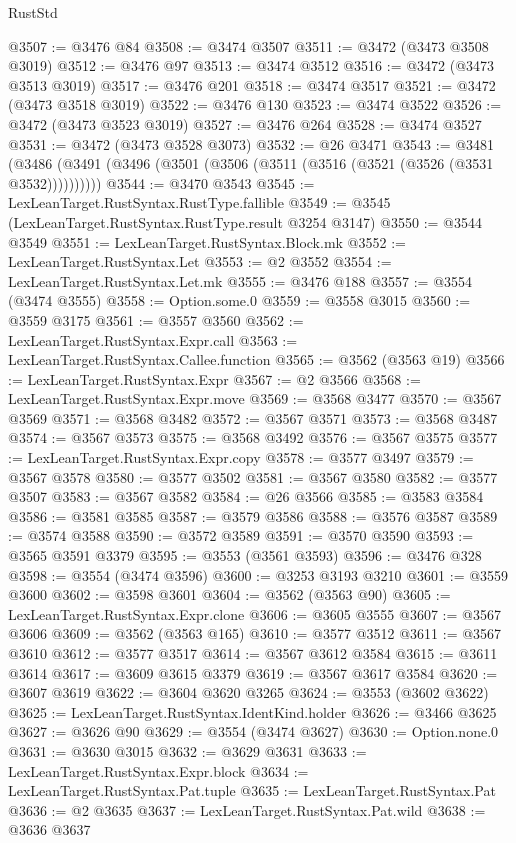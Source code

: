 \begin{lexlean}{RustStd}
\begin{coremodule}
@3507 := @3476 @84
@3508 := @3474 @3507
@3511 := @3472 (@3473 @3508 @3019)
@3512 := @3476 @97
@3513 := @3474 @3512
@3516 := @3472 (@3473 @3513 @3019)
@3517 := @3476 @201
@3518 := @3474 @3517
@3521 := @3472 (@3473 @3518 @3019)
@3522 := @3476 @130
@3523 := @3474 @3522
@3526 := @3472 (@3473 @3523 @3019)
@3527 := @3476 @264
@3528 := @3474 @3527
@3531 := @3472 (@3473 @3528 @3073)
@3532 := @26 @3471
@3543 := @3481 (@3486 (@3491 (@3496 (@3501 (@3506 (@3511 (@3516 (@3521 (@3526 (@3531 @3532))))))))))
@3544 := @3470 @3543
@3545 := LexLeanTarget.RustSyntax.RustType.fallible
@3549 := @3545 (LexLeanTarget.RustSyntax.RustType.result @3254 @3147)
@3550 := @3544 @3549
@3551 := LexLeanTarget.RustSyntax.Block.mk
@3552 := LexLeanTarget.RustSyntax.Let
@3553 := @2 @3552
@3554 := LexLeanTarget.RustSyntax.Let.mk
@3555 := @3476 @188
@3557 := @3554 (@3474 @3555)
@3558 := Option.some.{0}
@3559 := @3558 @3015
@3560 := @3559 @3175
@3561 := @3557 @3560
@3562 := LexLeanTarget.RustSyntax.Expr.call
@3563 := LexLeanTarget.RustSyntax.Callee.function
@3565 := @3562 (@3563 @19)
@3566 := LexLeanTarget.RustSyntax.Expr
@3567 := @2 @3566
@3568 := LexLeanTarget.RustSyntax.Expr.move
@3569 := @3568 @3477
@3570 := @3567 @3569
@3571 := @3568 @3482
@3572 := @3567 @3571
@3573 := @3568 @3487
@3574 := @3567 @3573
@3575 := @3568 @3492
@3576 := @3567 @3575
@3577 := LexLeanTarget.RustSyntax.Expr.copy
@3578 := @3577 @3497
@3579 := @3567 @3578
@3580 := @3577 @3502
@3581 := @3567 @3580
@3582 := @3577 @3507
@3583 := @3567 @3582
@3584 := @26 @3566
@3585 := @3583 @3584
@3586 := @3581 @3585
@3587 := @3579 @3586
@3588 := @3576 @3587
@3589 := @3574 @3588
@3590 := @3572 @3589
@3591 := @3570 @3590
@3593 := @3565 @3591 @3379
@3595 := @3553 (@3561 @3593)
@3596 := @3476 @328
@3598 := @3554 (@3474 @3596)
@3600 := @3253 @3193 @3210
@3601 := @3559 @3600
@3602 := @3598 @3601
@3604 := @3562 (@3563 @90)
@3605 := LexLeanTarget.RustSyntax.Expr.clone
@3606 := @3605 @3555
@3607 := @3567 @3606
@3609 := @3562 (@3563 @165)
@3610 := @3577 @3512
@3611 := @3567 @3610
@3612 := @3577 @3517
@3614 := @3567 @3612 @3584
@3615 := @3611 @3614
@3617 := @3609 @3615 @3379
@3619 := @3567 @3617 @3584
@3620 := @3607 @3619
@3622 := @3604 @3620 @3265
@3624 := @3553 (@3602 @3622)
@3625 := LexLeanTarget.RustSyntax.IdentKind.holder
@3626 := @3466 @3625
@3627 := @3626 @90
@3629 := @3554 (@3474 @3627)
@3630 := Option.none.{0}
@3631 := @3630 @3015
@3632 := @3629 @3631
@3633 := LexLeanTarget.RustSyntax.Expr.block
@3634 := LexLeanTarget.RustSyntax.Pat.tuple
@3635 := LexLeanTarget.RustSyntax.Pat
@3636 := @2 @3635
@3637 := LexLeanTarget.RustSyntax.Pat.wild
@3638 := @3636 @3637

\end{coremodule}
\end{lexlean}
